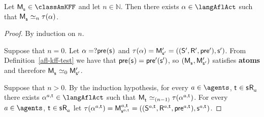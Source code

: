 \begin{proposition}\label{afl-kff-correspondence}
Let $\aPModel{\aStateS} \in \classAmKFF$ and let $n \in \mathbb{N}$. 
Then there exists $\alpha \in \langAflAct$ such that $\aPModel{\aStateS} \bisimilar[n] \tau(\alpha)$.
\end{proposition}

\begin{proof}
By induction on $n$.

Suppose that $n = 0$. 
Let $\alpha = \test{\aPrecondition(\aStateS)}$ and $\tau(\alpha) = \aPModelP{\aStateSP} = \aPModelTupleP{\aStateSP}$.
From Definition~\ref{afl-kff-test} we have that $\aPrecondition(\aStateS) = \aPreconditionP(\aStateSP)$, so $(\aPModel{\aStateS}, \aPModelP{\aStateSP})$ satisfies {\bf atoms} and therefore $\aPModel{\aStateS} \bisimilar[0] \aPModelP{\aStateSP}$.

Suppose that $n > 0$. 
By the induction hypothesis, for every $\agentA \in \agents$, $\aStateT \in \aStateS \aAccessibility{\agentA}$ there exists $\alpha^{\agentA,\aStateT} \in \langAflAct$ such that $\aPModel{\aStateT} \bisimilar[(n - 1)] \tau(\alpha^{\agentA,\aStateT})$.
For every $\agentA \in \agents$, $\aStateT \in \aStateS \aAccessibility{\agentA}$ let $\tau(\alpha^{\agentA,\aStateT}) = \aPModel[\agentA,\aStateT]{\aStateS[\agentA,\aStateT]} = \aPModelTuple[\agentA,\aStateT]{\aStateS[\agentA,\aStateT]}$.


\end{proof}
